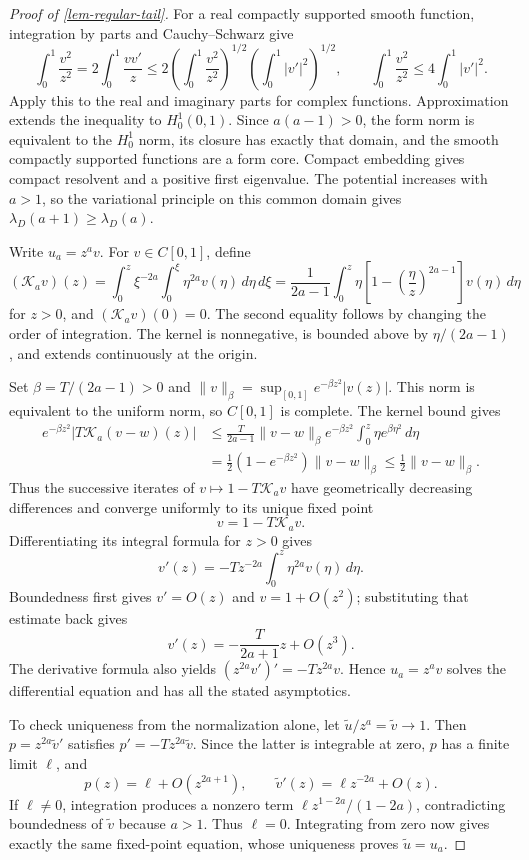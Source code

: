 \documentclass[11pt,a4paper]{article}
\theoremstyle{proofmanuscript}
\begin{document}
\begin{proof}[Proof of \ref{lem-regular-tail}]

For a real compactly supported smooth function, integration by parts and Cauchy--Schwarz give \[
\int_0^1\frac{v^2}{z^2}
=2\int_0^1\frac{vv'}z
\le2\left(\int_0^1\frac{v^2}{z^2}\right)^{1/2}
\left(\int_0^1|v'|^2\right)^{1/2},
\qquad
\int_0^1\frac{v^2}{z^2}\le4\int_0^1|v'|^2.
\] Apply this to the real and imaginary parts for complex functions. Approximation extends the inequality to \(H_0^1(0,1)\). Since \(a(a-1)>0\), the form norm is equivalent to the \(H_0^1\) norm, its closure has exactly that domain, and the smooth compactly supported functions are a form core. Compact embedding gives compact resolvent and a positive first eigenvalue. The potential increases with \(a>1\), so the variational principle on this common domain gives \(\lambda_D(a+1)\ge\lambda_D(a)\).

Write \(u_a=z^av\). For \(v\in C[0,1]\), define \[
(\mathcal K_av)(z)
=\int_0^z\xi^{-2a}\int_0^\xi\eta^{2a}v(\eta)\,d\eta\,d\xi
=\frac1{2a-1}\int_0^z
\eta\left[1-\left(\frac\eta z\right)^{2a-1}\right]v(\eta)\,d\eta
\] for \(z>0\), and \((\mathcal K_av)(0)=0\). The second equality follows by changing the order of integration. The kernel is nonnegative, is bounded above by \(\eta/(2a-1)\), and extends continuously at the origin.

Set \(\beta=T/(2a-1)>0\) and \(\|v\|_\beta=\sup_{[0,1]}e^{-\beta z^2}|v(z)|\). This norm is equivalent to the uniform norm, so \(C[0,1]\) is complete. The kernel bound gives \[
\begin{aligned}
e^{-\beta z^2}|T\mathcal K_a(v-w)(z)|
&\le\frac{T}{2a-1}\|v-w\|_\beta
e^{-\beta z^2}\int_0^z\eta e^{\beta\eta^2}\,d\eta\\
&=\frac12(1-e^{-\beta z^2})\|v-w\|_\beta
\le\frac12\|v-w\|_\beta.
\end{aligned}
\] Thus the successive iterates of \(v\mapsto1-T\mathcal K_av\) have geometrically decreasing differences and converge uniformly to its unique fixed point \[
v=1-T\mathcal K_av.
\] Differentiating its integral formula for \(z>0\) gives \[
v'(z)=-Tz^{-2a}\int_0^z\eta^{2a}v(\eta)\,d\eta.
\] Boundedness first gives \(v'=O(z)\) and \(v=1+O(z^2)\); substituting that estimate back gives \[
v'(z)=-\frac{T}{2a+1}z+O(z^3).
\] The derivative formula also yields \((z^{2a}v')'=-Tz^{2a}v\). Hence \(u_a=z^av\) solves the differential equation and has all the stated asymptotics.

To check uniqueness from the normalization alone, let \(\widetilde u/z^a=\widetilde v\to1\). Then \(p=z^{2a}\widetilde v'\) satisfies \(p'=-Tz^{2a}\widetilde v\). Since the latter is integrable at zero, \(p\) has a finite limit \(\ell\), and \[
p(z)=\ell+O(z^{2a+1}),\qquad
\widetilde v'(z)=\ell z^{-2a}+O(z).
\] If \(\ell\ne0\), integration produces a nonzero term \(\ell z^{1-2a}/(1-2a)\), contradicting boundedness of \(\widetilde v\) because \(a>1\). Thus \(\ell=0\). Integrating from zero now gives exactly the same fixed-point equation, whose uniqueness proves \(\widetilde u=u_a\).


\end{proof}
\end{document}
